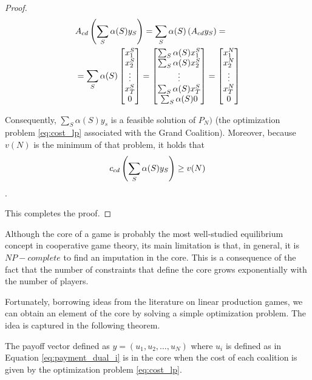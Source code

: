 \begin{proof}
\begin{equation}
  \begin{aligned}
&    A_{cd} \left(\sum_S \alpha(S) y_S \right) = \sum_S \alpha(S) \left( A_{cd} y_S \right) = \\ &= \sum_S \alpha(S) \begin{bmatrix} x^S_1 \\ x^S_2 \\ \vdots \\ x^S_T \\ 0 \end{bmatrix} = \begin{bmatrix} \sum_S \alpha(S) x^S_1 \\ \sum_S \alpha(S) x^S_2 \\ \vdots \\ \sum_S \alpha(S) x^S_T \\ \sum_S \alpha(S) 0 \end{bmatrix} = \begin{bmatrix} x^N_1 \\ x^N_2 \\ \vdots \\ x^N_T \\ 0 \end{bmatrix}
    \end{aligned}
\end{equation}

Consequently, $\sum_S \alpha(S) y_s$ is a feasible solution of $P_N)$ (the optimization problem \eqref{eq:cost_lp} associated with the Grand Coalition). Moreover, because $v(N)$ is the minimum of that problem, it holds that 
\[
  c_{cd} \left(\sum_S \alpha(S) y_S \right) \geq v(N)
 \].
 
 This completes the proof.

\end{proof}

Although the core of a game is probably the most well-studied equilibrium concept in cooperative game theory, its main limitation is that, in general, it is $NP-complete$ to find an imputation in the core. This is a consequence of the fact that the number of constraints that define the core grows exponentially with the number of players.

Fortunately, borrowing ideas from the literature on linear production games, we can obtain an element of the core by solving a simple optimization problem. The idea is captured in the following theorem.

\begin{theorem}\label{th:payoff_cd}

  The payoff vector defined as $y = (u_1, u_2, \dots, u_N)$ where $u_i$ is defined as in Equation \eqref{eq:payment_dual_i} is in the core when the cost of each coalition is given by the optimization problem \eqref{eq:cost_lp}.

\end{theorem}

